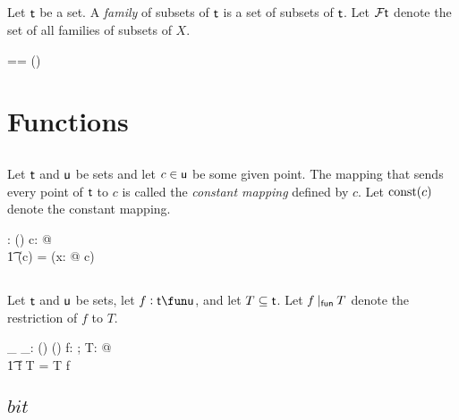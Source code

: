 \documentclass[11pt, oneside]{article}
\begin{document}
\subsection{}

Let $\mathsf{t}$ be a set.
A {\it family} of subsets of $\mathsf{t}$ is a set of subsets of $\mathsf{t}$.
Let $\mathcal{F} \mathsf{t}$ denote the set of all families of subsets of $X$.

\begin{zed}
	\family \genT == \power(\power \genT)
\end{zed}

\section{Functions}


\subsection{}

Let $\mathsf{t}$ and $\mathsf{u}$ be sets and let $c \in \mathsf{u}$ be some given point.
The mapping that sends every point of $\mathsf{t}$ to $c$ is called the {\it constant mapping} defined by $c$.
Let $\operatorname{const}(c)$ denote the constant mapping.

\begin{gendef}[\genT, \genU]
	\const: \genU \fun (\genT \fun \genU)
\where
	\forall c: \genU @ \\
	\t1	\const(c) = (\lambda x: \genT @ c)
\end{gendef}


\subsection{}

Let $\mathsf{t}$ and $\mathsf{u}$ be sets, let $f: \genT \fun \genU$, and let $T \subseteq \mathsf{t}$.
Let $f \mathbin{|_{\mathsf{fun}}} T$ denote the restriction of $f$ to $T$.

\begin{gendef}[\genT, \genU]
	\_ \restrictU \_: (\genT \fun \genU) \cross \power \genT \fun (\genT \pfun \genU)
\where
	\forall f: \genT \fun \genU; T: \power \genT @ \\
	\t1	f \restrictU T = T \dres f
\end{gendef}

\subsection{$bit$}
\end{document}
